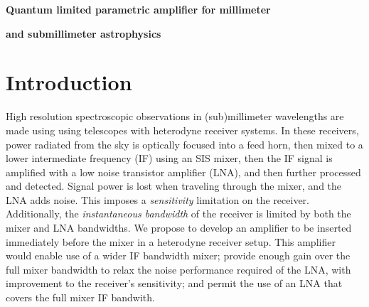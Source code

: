 






\centerline{\textbf{Quantum limited parametric amplifier for millimeter}}
\centerline{\textbf{and submillimeter astrophysics}}


\section{Introduction}
High resolution spectroscopic observations in (sub)millimeter wavelengths are made using using telescopes with heterodyne receiver systems. In these receivers, power radiated from the sky is optically focused into a feed horn, then mixed to a lower intermediate frequency (IF) using an SIS mixer, then the IF signal is amplified with a low noise transistor amplifier (LNA), and then further processed and detected. Signal power is lost when traveling through the mixer, and the LNA adds noise. This imposes a \emph{sensitivity} limitation on the receiver. Additionally, the \emph{instantaneous bandwidth} of the receiver is limited by both the mixer and LNA bandwidths. We propose to develop an amplifier to be inserted immediately before the mixer in a heterodyne receiver setup. This amplifier would enable use of a wider IF bandwidth mixer; provide enough gain over the full mixer bandwidth to relax the noise performance required of the LNA, with improvement to the receiver's sensitivity; and permit the use of an LNA that covers the full mixer IF bandwith.

   

